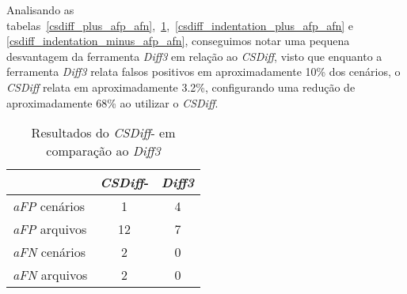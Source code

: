 Analisando as
tabelas~\ref{csdiff_plus_afp_afn},~\ref{csdiff_minus_afp_afn},~\ref{csdiff_indentation_plus_afp_afn}
e \ref{csdiff_indentation_minus_afp_afn}, conseguimos notar uma pequena
desvantagem da ferramenta \emph{Diff3} em relação ao \emph{CSDiff}, visto que
enquanto a ferramenta \emph{Diff3} relata falsos positivos em aproximadamente
10\% dos cenários, o \emph{CSDiff} relata em aproximadamente 3.2\%,
configurando uma redução de aproximadamente 68\% ao utilizar o \emph{CSDiff}.

\begin{table}[ht]
	\begin{center}
		\begin{tabular}{|l|c|c|}
			\hline
			\textbf{ }          & \textbf{\emph{CSDiff}-} & \textbf{\emph{Diff3}} \\
			\hline
			\emph{aFP} cenários & 1                       & 4                     \\
			\emph{aFP} arquivos & 12                      & 7                     \\
			\emph{aFN} cenários & 2                       & 0                     \\
			\emph{aFN} arquivos & 2                       & 0                     \\
			\hline
		\end{tabular}
	\end{center}
	\caption{Resultados do \emph{CSDiff}- em comparação ao \emph{Diff3}}\label{csdiff_minus_afp_afn}
\end{table}


